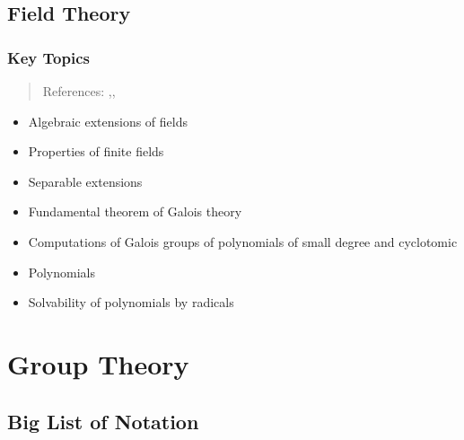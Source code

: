 \hypertarget{field-theory}{%
\subsection{Field Theory}\label{field-theory}}

\hypertarget{key-topics-4}{%
\subsubsection{Key Topics}\label{key-topics-4}}

\begin{quote}
References:
\autocite{dummit_foote_2004},\autocite{hungerford_2008},\autocite{smith}
\end{quote}

\begin{itemize}
\item
  Algebraic extensions of fields
\item
  Properties of finite fields
\item
  Separable extensions
\item
  Fundamental theorem of Galois theory
\item
  Computations of Galois groups of polynomials of small degree and
  cyclotomic
\item
  Polynomials
\item
  Solvability of polynomials by radicals
\end{itemize}

\hypertarget{group-theory-1}{%
\section{Group Theory}\label{group-theory-1}}

\hypertarget{big-list-of-notation}{%
\subsection{Big List of Notation}\label{big-list-of-notation}}

